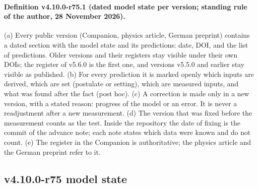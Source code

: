 \paragraph{Definition v4.10.0-r75.1 (dated model state per version; standing rule of the author, 28 November 2026).}
(a) Every public version (Companion, physics article, German preprint) contains a dated section with the model state and its predictions:
date, DOI, and the list of predictions.  Older versions and their registers stay visible under their own DOIs; the register of v5.6.0 is the
first one, and versions v5.5.0 and earlier stay visible as published.
(b) For every prediction it is marked openly which inputs are derived, which are set (postulate or setting), which are measured inputs, and
what was found after the fact (post hoc).
(c) A correction is made only in a new version, with a stated reason: progress of the model or an error.  It is never a readjustment after a
new measurement.
(d) The version that was fixed before the measurement counts as the test.  Inside the repository the date of fixing is the commit of the
advance note; each note states which data were known and do not count.
(e) The register in the Companion is authoritative; the physics article and the German preprint refer to it.

\subsection*{v4.10.0-r75 model state}
\label{subsec:v4100-r75-model-state}

